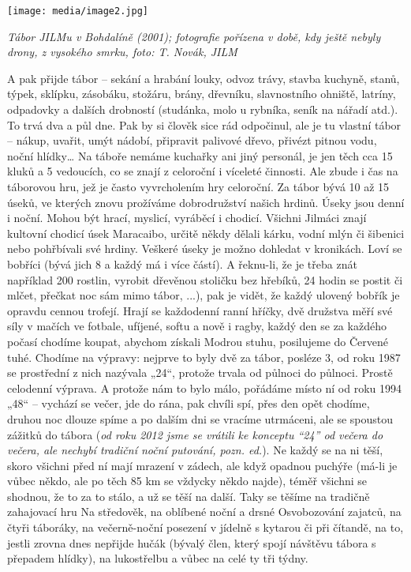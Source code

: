 \texttt{[image: media/image2.jpg]}

\emph{Tábor JILMu v Bohdalíně (2001); fotografie pořízena v době, kdy
ještě nebyly drony, z vysokého smrku, foto: T. Novák, JILM}

A pak přijde tábor -- sekání a hrabání louky, odvoz trávy, stavba
kuchyně, stanů, týpek, sklípku, zásobáku, stožáru, brány, dřevníku,
slavnostního ohniště, latríny, odpadovky a dalších drobností (studánka,
molo u rybníka, seník na nářadí atd.). To trvá dva a půl dne. Pak by si
člověk sice rád odpočinul, ale je tu vlastní tábor -- nákup, uvařit,
umýt nádobí, připravit palivové dřevo, přivézt pitnou vodu, noční
hlídky\ldots{} Na táboře nemáme kuchařky ani jiný personál, je jen těch
cca 15 kluků a 5 vedoucích, co se znají z celoroční i víceleté činnosti.
Ale zbude i čas na táborovou hru, jež je často vyvrcholením hry
celoroční. Za tábor bývá 10 až 15 úseků, ve kterých znovu prožíváme
dobrodružství našich hrdinů. Úseky jsou denní i noční. Mohou být hrací,
myslicí, vyráběcí i chodicí. Všichni Jilmáci znají kultovní chodicí úsek
Maracaibo, určitě někdy dělali kárku, vodní mlýn či šibenici nebo
pohřbívali své hrdiny. Veškeré úseky je možno dohledat v kronikách. Loví
se bobříci (bývá jich 8 a každý má i více částí). A řeknu-li, že je
třeba znát například 200 rostlin, vyrobit dřevěnou stoličku bez hřebíků,
24 hodin se postit či mlčet, přečkat noc sám mimo tábor, ...), pak je
vidět, že každý ulovený bobřík je opravdu cennou trofejí. Hrají se
každodenní ranní hříčky, dvě družstva měří své síly v mačích ve fotbale,
ufíjené, softu a nově i ragby, každý den se za každého počasí chodíme
koupat, abychom získali Modrou stuhu, posilujeme do Červené tuhé.
Chodíme na výpravy: nejprve to byly dvě za tábor, posléze 3, od roku
1987 se prostřední z nich nazývala „24``, protože trvala od půlnoci do
půlnoci. Prostě celodenní výprava. A protože nám to bylo málo, pořádáme
místo ní od roku 1994 „48`` -- vychází se večer, jde do rána, pak chvíli
spí, přes den opět chodíme, druhou noc dlouze spíme a po dalším dni se
vracíme utrmáceni, ale se spoustou zážitků do tábora (\emph{od roku 2012
jsme se vrátili ke konceptu ``24'' od večera do večera, ale nechybí
tradiční noční putování, pozn. ed.}). Ne každý se na ni těší, skoro
všichni před ní mají mrazení v zádech, ale když opadnou puchýře (má-li
je vůbec někdo, ale po těch 85 km se vždycky někdo najde), téměř všichni
se shodnou, že to za to stálo, a už se těší na další. Taky se těšíme na
tradičně zahajovací hru Na středověk, na oblíbené noční a drsné
Osvobozování zajatců, na čtyři táboráky, na večerně-noční posezení v
jídelně s kytarou či při čítandě, na to, jestli zrovna dnes nepřijde
hučák (bývalý člen, který spojí návštěvu tábora s přepadem hlídky), na
lukostřelbu a vůbec na celé ty tři týdny.

